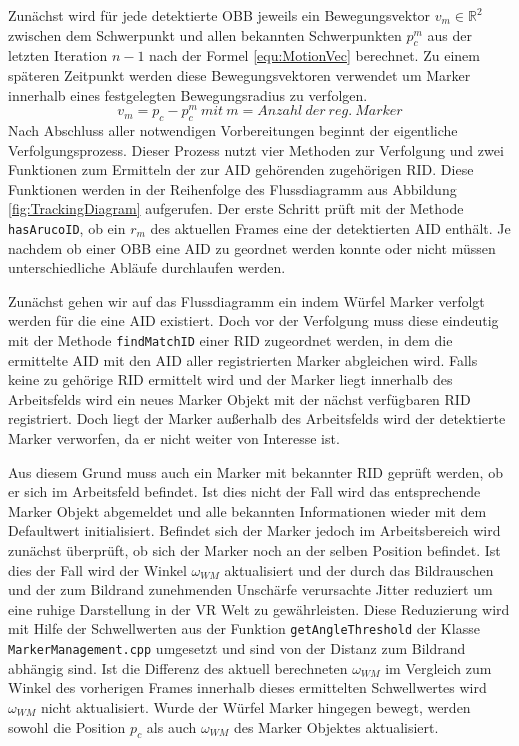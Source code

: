 Zunächst wird für jede detektierte OBB jeweils ein Bewegungsvektor $v_m \in \mathbb{R}^2$ zwischen dem Schwerpunkt und allen bekannten Schwerpunkten $p_c^{m}$ aus der letzten Iteration $n-1$ nach der Formel \ref{equ:MotionVec} berechnet. Zu einem späteren Zeitpunkt werden diese Bewegungsvektoren verwendet um Marker innerhalb eines festgelegten Bewegungsradius zu verfolgen. 
\begin{equation}
\label{equ:MotionVec}
v_m = p_c - p_c^m \ mit \ m= Anzahl \ der \ reg. \ Marker
\end{equation}
Nach Abschluss aller notwendigen Vorbereitungen beginnt der eigentliche Verfolgungsprozess. Dieser Prozess nutzt vier Methoden zur Verfolgung und zwei Funktionen zum Ermitteln der zur AID gehörenden zugehörigen RID. Diese Funktionen werden in der Reihenfolge des Flussdiagramm aus Abbildung \ref{fig:TrackingDiagram} aufgerufen. Der erste Schritt prüft mit der Methode \texttt{hasArucoID}, ob ein $r_m$ des aktuellen Frames eine der detektierten AID enthält. Je nachdem ob einer OBB eine AID zu geordnet werden konnte oder nicht müssen unterschiedliche Abläufe durchlaufen werden.

Zunächst gehen wir auf das Flussdiagramm ein indem Würfel Marker verfolgt werden für die eine AID existiert. Doch vor der Verfolgung muss diese eindeutig mit der Methode \texttt{findMatchID} einer RID zugeordnet werden, in dem die ermittelte AID mit den AID aller registrierten Marker abgleichen wird. Falls keine zu gehörige RID ermittelt wird und der Marker liegt innerhalb des Arbeitsfelds wird ein neues Marker Objekt mit der nächst verfügbaren RID registriert. Doch liegt der Marker außerhalb des Arbeitsfelds wird der detektierte Marker verworfen, da er nicht weiter von Interesse ist.

Aus diesem Grund muss auch ein Marker mit bekannter RID geprüft werden, ob er sich im Arbeitsfeld befindet. Ist dies nicht der Fall wird das entsprechende Marker Objekt abgemeldet und alle bekannten Informationen wieder mit dem Defaultwert initialisiert. Befindet sich der Marker jedoch im Arbeitsbereich wird zunächst überprüft, ob sich der Marker noch an der selben Position befindet. Ist dies der Fall wird der Winkel $\omega_{WM}$ aktualisiert und der durch das Bildrauschen und der zum Bildrand zunehmenden Unschärfe verursachte Jitter reduziert um eine ruhige Darstellung in der VR Welt zu gewährleisten. Diese Reduzierung wird mit Hilfe der Schwellwerten aus der Funktion \texttt{getAngleThreshold} der Klasse \texttt{MarkerManagement.cpp} umgesetzt und sind von der Distanz zum Bildrand abhängig sind. Ist die Differenz des aktuell berechneten $\omega_{WM}$ im Vergleich zum Winkel des vorherigen Frames innerhalb dieses ermittelten Schwellwertes wird $\omega_{WM}$ nicht aktualisiert. Wurde der Würfel Marker hingegen bewegt, werden sowohl die Position $p_c$ als auch $\omega_{WM}$ des Marker Objektes aktualisiert.

